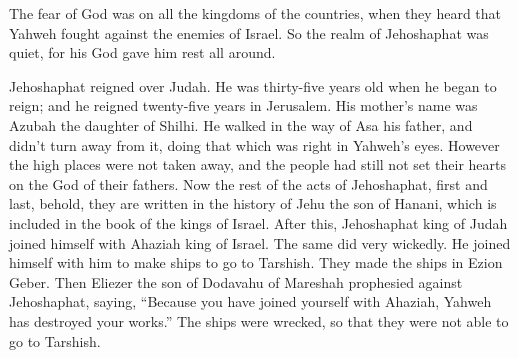 {The fear of God was on all the kingdoms of the countries, when they heard that Yahweh fought against the enemies of Israel.
So the realm of Jehoshaphat was quiet, for his God gave him rest all around.
\par }{\PP {}Jehoshaphat reigned over Judah. He was thirty-five years old when he began to reign; and he reigned twenty-five years in Jerusalem. His mother’s name was Azubah the daughter of Shilhi.
He walked in the way of Asa his father, and didn’t turn away from it, doing that which was right in Yahweh’s eyes.
However the high places were not taken away, and the people had still not set their hearts on the God of their fathers.
Now the rest of the acts of Jehoshaphat, first and last, behold, they are written in the history of Jehu the son of Hanani, which is included in the book of the kings of Israel.
After this, Jehoshaphat king of Judah joined himself with Ahaziah king of Israel. The same did very wickedly.
He joined himself with him to make ships to go to Tarshish. They made the ships in Ezion Geber.
Then Eliezer the son of Dodavahu of Mareshah prophesied against Jehoshaphat, saying, “Because you have joined yourself with Ahaziah, Yahweh has destroyed your works.” The ships were wrecked, so that they were not able to go to Tarshish.

}
